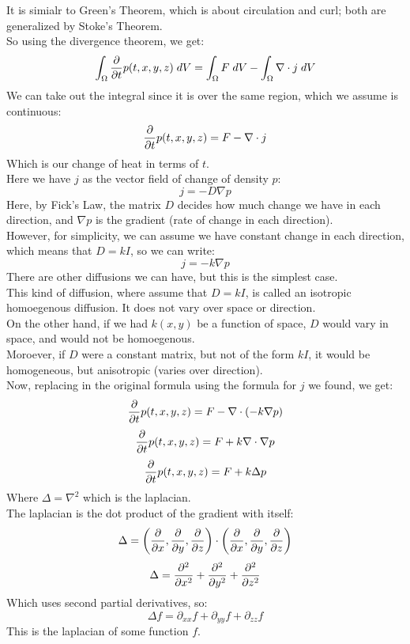 \documentclass[12pt]{article}
\begin{document}
It is simialr to Green's Theorem,
which is about circulation and curl;
both are generalized by Stoke's Theorem. \\

So using the divergence theorem, we get:
\[ \int_\Omega \dfrac{\partial }{\partial t} p(t, x, y, z) \; dV
= \int_\Omega F \; dV
- \int_{\Omega} \nabla \cdot j \; dV \]
We can take out the integral since it
is over the same region, which we assume is
continuous:
\[  \dfrac{\partial }{\partial t} p(t, x, y, z)
= F - \nabla \cdot j \]
Which is our change of heat in terms of $t$. \\

Here we have $j$ as the vector
field of change of density $p$:
\[ j = -D\nabla p \]
Here, by Fick's Law, the matrix $D$
decides how much change we have in each
direction, and $\nabla p$ is the gradient
(rate of change in each direction). \\
However, for simplicity,
we can assume we have constant change
in each direction, which means that
$D = kI$, so we can write:
\[ j = -k\nabla p \]
There are other diffusions we can have,
but this is the simplest case. \\

This kind of diffusion, where assume that
$D = kI$, is called an isotropic homoegenous
diffusion. It does not vary over space or direction. \\
On the other hand, if we had $k(x, y)$
be a function of space, $D$ would vary in space,
and would not be homoegenous. \\
Moroever, if $D$ were a constant matrix,
but not of the form $kI$, it would be homogeneous,
but anisotropic (varies over direction). \\

Now, replacing in the original formula
using the formula for $j$ we found, we get:
\[  \dfrac{\partial }{\partial t} p(t, x, y, z)
= F - \nabla \cdot (-k\nabla p) \]
\[  \dfrac{\partial }{\partial t} p(t, x, y, z)
= F + k \nabla \cdot \nabla p \]
\[  \dfrac{\partial }{\partial t} p(t, x, y, z)
= F + k \Delta p \]
Where $\Delta = \nabla^2$ which is
the laplacian. \\

The laplacian is the dot product of
the gradient with itself:
\[ \Delta = \left( \dfrac{\partial }{\partial x}, 
\dfrac{\partial }{\partial y}, \dfrac{\partial }{\partial z} \right)
\cdot \left( \dfrac{\partial }{\partial x}, 
\dfrac{\partial }{\partial y}, \dfrac{\partial }{\partial z} \right) \]
\[ \Delta = \dfrac{\partial ^2}{\partial x^2} +
\dfrac{\partial ^2}{\partial y^2} + \dfrac{\partial ^2}{\partial z^2} \]
Which uses second partial derivatives, so:
\[ \Delta f = \partial_{xx} f + 
\partial_{yy} f + \partial_{zz} f \]
This is the laplacian of some function $f$. \\
\end{document}
